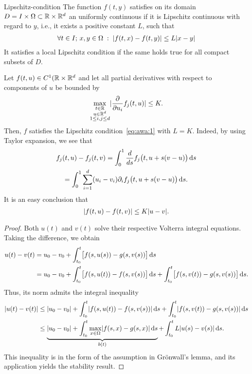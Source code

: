 \begin{Definition}{Lipschitz-condition}
  The function $f(t,y)$ satisfies on its domain $D = I\times\Omega \subset
  \mathbb R \times \mathbb R^d$ an uniformly continuous  if 
	it is Lipschitz continuous with regard to $y$, i.e., it exists a 
	positive constant $L$, such that
  \begin{gather}
    \label{eq:awa:1}
    \forall t\in I;\,x,y\in\Omega \;:\;
    \lvert f(t,x)-f(t,y)\rvert \le L \lvert x-y\rvert
  \end{gather}
  It satisfies a local Lipschitz condition if the same holds true for all 
  compact subsets of $D$.
\end{Definition}


\begin{example}
  Let $f(t,u)\in C^1(\mathbb R \times\mathbb R^d $ and let all partial derivatives
  with respect to components of $u$ be bounded by
  \begin{gather*}
    \max_{\substack{t\in \mathbb R\\u\in \mathbb R^d\\1\le i,j \le d}}
   \lvert
     \frac{\partial}{\partial u_i} f_j(t,u)
   \rvert \le K.
  \end{gather*}
  Then, $f$ satisfies the Lipschitz condition~\eqref{eq:awa:1} with
  $L=K$. Indeed, by using Taylor expansion, we see that
  \begin{multline*}
    f_j(t, u) - f_j(t,v)
    = \int_0^1 \frac{d}{ds}f_j\bigl(t,u+s(v-u)\bigr)\,\mathrm{d} s\\
    = \int_0^1 \sum_{i=1}^d(u_i-v_i)\partial_if_j\bigl(t,u+s(v-u)\bigr)\,\mathrm{d} s.
  \end{multline*}
  It is an easy conclusion that
  \begin{gather*}
    \lvert f(t,u)-f(t,v)\rvert
    \le K \lvert u-v\rvert.
  \end{gather*}
\end{example}




\begin{proof}
  Both $u(t)$ and $v(t)$ solve their respective Volterra integral
  equations. Taking the difference, we obtain
  \begin{align*}
    u(t)-v(t) &= u_0-v_0
           + \int_{t_0}^t \bigl[ f(s,u(s)) - g(s,v(s)) \bigr]\,\mathrm{d} s
    \\
         &= u_0-v_0
           + \int_{t_0}^t \bigl[ f(s,u(t)) - f(s,v(s)) \bigr]\,\mathrm{d} s
           + \int_{t_0}^t \bigl[ f(s,v(t)) - g(s,v(s)) \bigr]\,\mathrm{d} s.
  \end{align*}
  Thus, its norm admits the integral inequality
  \begin{align*}
    \lvert u(t)-v(t)\rvert
    &\le \lvert u_0-v_0\rvert + \int_{t_0}^t\lvert f(s,u(t)) - f(s,v(s))\rvert \,\mathrm{d} s
    + \int_{t_0}^t \lvert f(s,v(t)) - g(s,v(s))\rvert \,\mathrm{d} s
    \\
    &\le \underbrace{\lvert u_0-v_0\rvert
      + \int_{t_0}^t \max_{x\in\Omega} \lvert f(s,x)-g(s,x)\rvert\,\mathrm{d} s}_{b(t)}
      + \int_{t_0}^t L \lvert u(s)-v(s)\rvert \,\mathrm{d} s.
  \end{align*}
  This inequality is in the form of the assumption in Grönwall's
  lemma, and its application yields the stability result.
\end{proof}


